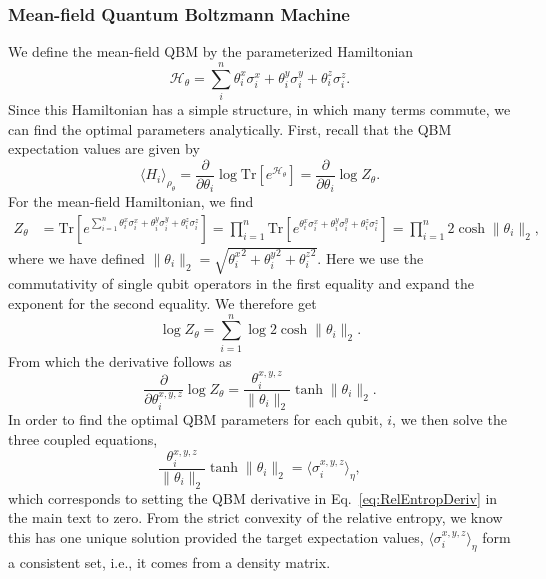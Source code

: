 \documentclass[
    aps,
    prx,
    floatfix,
    nofootinbib,
    onecolumn
]{revtex4-2}
\newcommand{\Tr}{\mathrm{Tr}}
\begin{document}
\subsubsection{Mean-field Quantum Boltzmann Machine}
We define the mean-field QBM by the parameterized Hamiltonian 
 \begin{equation}
    \mathcal{H}_\theta = \sum_i^n \theta^x_i \sigma_i^x + \theta^y_i \sigma_i^y +  \theta^z_i \sigma_i^z.
\end{equation} Since this Hamiltonian has a simple structure, in which many terms commute, we can find the optimal parameters analytically. First, recall that the QBM expectation values are given by \begin{equation}
    \langle H_i\rangle_{\rho_\theta} = \frac{\partial}{\partial \theta_i} \log{\Tr[e^{\mathcal{H}_\theta}]} =  \frac{\partial}{\partial \theta_i}\log{Z_\theta}. 
\end{equation} 
For the mean-field Hamiltonian, we find 
\begin{align}
    Z_\theta &= \Tr[e^{\sum_{i=1}^n\theta^x_i \sigma_i^x + \theta^y_i \sigma_i^y +  \theta^z_i \sigma_i^z}]
    =\prod_{i=1}^n \Tr[ e^{\theta^x_i \sigma_i^x + \theta^y_i \sigma_i^y + \theta^z_i \sigma_i^z}]
    = \prod_{i=1}^n 2\cosh{\|\theta_i\|_2},
\end{align} 
where we have defined $\|\theta_i\|_2=\sqrt{ {\theta_i^x}^2 + {\theta_i^y}^2 +{\theta_i^z}^2}$. Here we use the commutativity of single qubit operators in the first equality and expand the exponent for the second equality.  We therefore get \begin{equation}
\log{Z_\theta} = \sum^n_{i=1} \log{2\cosh{ \| \theta_i \|_2}}. 
\end{equation} 
From which the derivative follows as 
\begin{equation}
    \frac{\partial}{\partial \theta_i^{x,y,z}} \log{Z_\theta}
    = \frac{\theta_i^{x,y,z}}{\|\theta_i\|_2} \tanh{\|\theta_i\|_2}. 
\end{equation} 
In order to find the optimal QBM parameters for each qubit, $i$, we then solve the three coupled equations,
\begin{equation}
\label{eq:MFcoupled}
    \frac{\theta_i^{x,y,z}}{\|\theta_i\|_2} \tanh{\|\theta_i\|_2} = \langle \sigma_i^{x,y,z}\rangle_\eta,
\end{equation} 
which corresponds to setting the QBM derivative in Eq.~\eqref{eq:RelEntropDeriv} in the main text to zero. From the strict convexity of the relative entropy, we know this has one unique solution provided the target expectation values, $\langle \sigma_i^{x,y,z}\rangle_\eta$ form a consistent set, i.e., it comes from a density matrix. 
\end{document}
